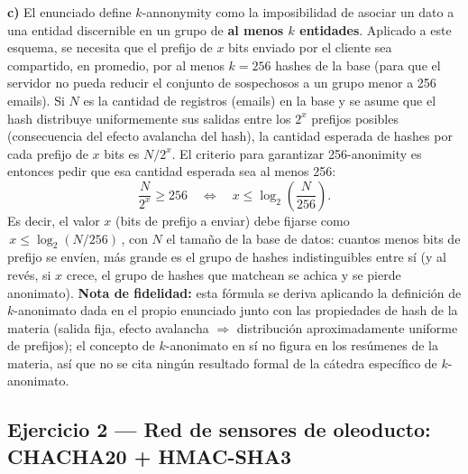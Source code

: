 \textbf{c)} El enunciado define $k$-annonymity como la imposibilidad de asociar un dato
a una entidad discernible en un grupo de \textbf{al menos $k$ entidades}. Aplicado a
este esquema, se necesita que el prefijo de $x$ bits enviado por el cliente sea
compartido, en promedio, por al menos $k=256$ hashes de la base (para que el servidor
no pueda reducir el conjunto de sospechosos a un grupo menor a 256 emails). Si $N$ es la
cantidad de registros (emails) en la base y se asume que el hash distribuye
uniformemente sus salidas entre los $2^x$ prefijos posibles (consecuencia del efecto
avalancha del hash), la cantidad esperada de hashes por cada prefijo de $x$ bits es
$N/2^x$. El criterio para garantizar 256-anonimity es entonces pedir que esa cantidad
esperada sea al menos 256:
\begin{equation*}
\frac{N}{2^{x}} \ge 256 \quad\Longleftrightarrow\quad x \le \log_2\!\left(\frac{N}{256}\right).
\end{equation*}
Es decir, el valor $x$ (bits de prefijo a enviar) debe fijarse como
$\boxed{\,x \le \log_2(N/256)\,}$, con $N$ el tamaño de la base de datos: cuantos menos
bits de prefijo se envíen, más grande es el grupo de hashes indistinguibles entre sí (y
al revés, si $x$ crece, el grupo de hashes que matchean se achica y se pierde
anonimato). \textbf{Nota de fidelidad:} esta fórmula se deriva aplicando la definición
de $k$-anonimato dada en el propio enunciado junto con las propiedades de hash de la
materia (salida fija, efecto avalancha $\Rightarrow$ distribución aproximadamente
uniforme de prefijos); el concepto de $k$-anonimato en sí no figura en los resúmenes de
la materia, así que no se cita ningún resultado formal de la cátedra específico de
$k$-anonimato.

\subsection{Ejercicio 2 --- Red de sensores de oleoducto: CHACHA20 + HMAC-SHA3}

